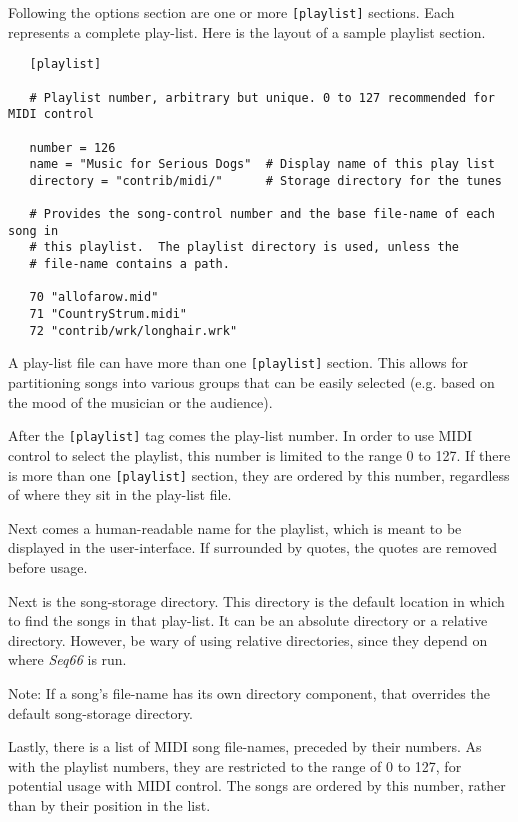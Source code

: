    Following the options section are one or more \texttt{[playlist]} sections.
   Each represents a complete play-list.
   Here is the layout of a sample playlist section.

   \begin{verbatim}
   [playlist]

   # Playlist number, arbitrary but unique. 0 to 127 recommended for MIDI control

   number = 126
   name = "Music for Serious Dogs"  # Display name of this play list
   directory = "contrib/midi/"      # Storage directory for the tunes

   # Provides the song-control number and the base file-name of each song in
   # this playlist.  The playlist directory is used, unless the
   # file-name contains a path.

   70 "allofarow.mid"
   71 "CountryStrum.midi"
   72 "contrib/wrk/longhair.wrk"
   \end{verbatim}

   A play-list file can have more than one \texttt{[playlist]} section.  This
   allows for partitioning songs into various groups that can be easily
   selected (e.g. based on the mood of the musician or the audience).

   After the \texttt{[playlist]} tag comes the play-list number.
   In order to use MIDI control to select the playlist, this number
   is limited to the range 0 to 127.
   If there is more than one \texttt{[playlist]} section, they are ordered by
   this number, regardless of where they sit in the play-list file.

   Next comes a human-readable name for the playlist, which is meant to be
   displayed in the user-interface.  If surrounded by quotes, the quotes are
   removed before usage.

   Next is the song-storage directory.
   This directory is the default location in which to find the songs
   in that play-list.
   It can be an absolute directory or a relative directory.
   However, be wary of using relative directories, since they depend on where
   \textsl{Seq66} is run.

   Note: If a song's file-name has its own directory component, that overrides
   the default song-storage directory.

   Lastly, there is a list of MIDI song file-names, preceded by their numbers.
   As with the playlist numbers, they are restricted to the range of 0 to
   127, for potential usage with MIDI control.
   The songs are ordered by this number,
   rather than by their position in the list.

